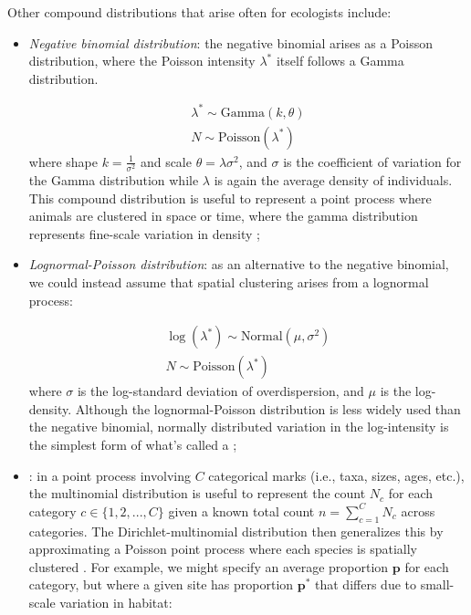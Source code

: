 Other compound distributions that arise often for ecologists include:
\begin{itemize}
    \item \textit{Negative binomial distribution}:  the negative binomial arises as a Poisson distribution, where the Poisson intensity \(\lambda^*\) itself follows a Gamma distribution.  
    
\begin{equation} \label{eq:Chap2_Negative-Binomial}
\begin{gathered}
    \lambda^* \sim \mathrm{Gamma}(k, \theta) \\
    N \sim \mathrm{Poisson}(\lambda^*)
\end{gathered}
\end{equation}
    where shape \(k = \frac{1}{\sigma^2}\) and scale \( \theta = \lambda \sigma^2 \), and \( \sigma \) is the coefficient of variation for the Gamma distribution while \(\lambda\) is again the average density of individuals.  This compound distribution is useful to represent a point process where animals are clustered in space or time, where the gamma distribution represents fine-scale variation in density \cite{linden_using_2011};

    \item \textit{{Lognormal-Poisson distribution}}:  as an alternative to the negative binomial, we could instead assume that spatial clustering arises from a lognormal process:
    
\begin{equation} \label{eq:Chap2_Lognormal-Poisson}
\begin{gathered}
    \log(\lambda^*) \sim \mathrm{Normal}( \mu, \sigma^2) \\
    N \sim \mathrm{Poisson}(\lambda^*)
\end{gathered}
\end{equation}
    where \( \sigma \) is the log-standard deviation of overdispersion, and \(\mu\) is the log-density.  Although the  lognormal-Poisson distribution is less widely used than the negative binomial, normally distributed variation in the log-intensity is the simplest form of what's called a ;  
    
    \item {}: in a point process involving \(C\) categorical marks (i.e., taxa, sizes, ages, etc.), the multinomial distribution is useful to represent the count \(N_c\) for each category \(c \in \{1,2,...,C\}\) given a known total count \( n = \sum_{c=1}^{C} N_c \) across categories.  The Dirichlet-multinomial distribution then generalizes this by approximating a Poisson point process where each species is spatially clustered \cite{thorson_model-based_2016}. For example, we might specify an average proportion \(\mathbf{p}\) for each category, but where a given site has proportion \(\mathbf{p}^*\) that differs due to small-scale variation in habitat:


\end{itemize}
